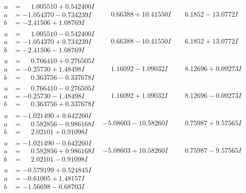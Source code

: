\documentclass[1p]{elsarticle_modified}
\theoremstyle{definition}
\begin{document}
$$\begin{array}{c|c|c}
\begin{aligned}
u &= \phantom{-}1.005510 + 0.542400 I \\
a &= -1.054370 - 0.734239 I \\
b &= -2.41506 + 1.08769 I\end{aligned}
 & \phantom{-}0.66388 + 10.41550 I & \phantom{-}6.1852 - 13.0772 I \\ \hline\begin{aligned}
u &= \phantom{-}1.005510 - 0.542400 I \\
a &= -1.054370 + 0.734239 I \\
b &= -2.41506 - 1.08769 I\end{aligned}
 & \phantom{-}0.66388 - 10.41550 I & \phantom{-}6.1852 + 13.0772 I \\ \hline\begin{aligned}
u &= \phantom{-}0.766410 + 0.276505 I \\
a &= -0.25730 + 1.48498 I \\
b &= \phantom{-}0.363756 - 0.337678 I\end{aligned}
 & \phantom{-}1.16092 - 1.09032 I & \phantom{-}8.12696 + 0.09273 I \\ \hline\begin{aligned}
u &= \phantom{-}0.766410 - 0.276505 I \\
a &= -0.25730 - 1.48498 I \\
b &= \phantom{-}0.363756 + 0.337678 I\end{aligned}
 & \phantom{-}1.16092 + 1.09032 I & \phantom{-}8.12696 - 0.09273 I \\ \hline\begin{aligned}
u &= -1.021490 + 0.642260 I \\
a &= \phantom{-}0.582856 - 0.986168 I \\
b &= \phantom{-}2.02101 + 0.91098 I\end{aligned}
 & -5.08603 - 10.58260 I & \phantom{-}0.75987 + 9.57565 I \\ \hline\begin{aligned}
u &= -1.021490 - 0.642260 I \\
a &= \phantom{-}0.582856 + 0.986168 I \\
b &= \phantom{-}2.02101 - 0.91098 I\end{aligned}
 & -5.08603 + 10.58260 I & \phantom{-}0.75987 - 9.57565 I \\ \hline\begin{aligned}
u &= -0.579199 + 0.524845 I \\
a &= -0.61005 + 1.48157 I \\
b &= -1.56698 - 0.68703 I\end{aligned}

\end{array}$$
\end{document}

